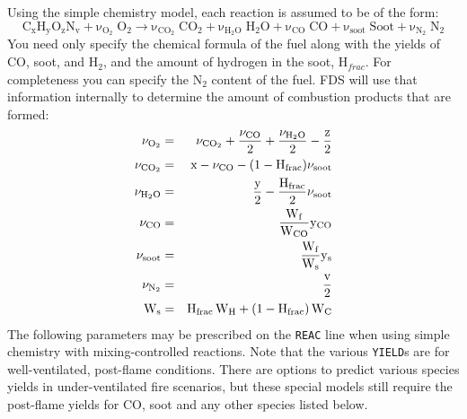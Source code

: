 \documentclass[11pt]{book}
\newcommand{\ct}{\tt\small}
\newcommand{\be}{\begin{equation}}
\newcommand{\ee}{\end{equation}}
\begin{document}
\noindent
Using the simple chemistry model, each reaction is assumed to be of the form:
\be \mathrm{C_xH_yO_zN_v + \nu_{O_2} \; O_2 \rightarrow
    \nu_{CO_2} \; CO_2 + \nu_{H_2O} \; H_2O +
    \nu_{CO}   \; CO   + \nu_{soot} \; Soot + \nu_{N_2} \; N_2} \ee
You need only specify the chemical formula of the fuel along with
the yields of CO, soot, and H$_2$, and the amount of hydrogen in the soot, H$_{frac}$.
For completeness you can specify the N$_2$ content of
the fuel. FDS will use that information internally to
determine the amount of combustion products that are formed:
\begin{eqnarray*}
\mathrm{ \nu_{O_2}  }    &=& \mathrm{ \nu_{CO_2} + \frac{\nu_{CO}}{2} + \frac{\nu_{H_2O}}{2} - \frac{\hbox{z}}{2}  } \\
\mathrm{ \nu_{CO_2} }    &=& \mathrm{ \hbox{x} - \nu_{CO} - (1-H_{frac}) \nu_{soot} }  \\
\mathrm{ \nu_{H_2O} }    &=& \mathrm{ \frac{\hbox{y}}{2} - \frac{H_{frac}}{2} \nu_{soot}}\\
\mathrm{ \nu_{CO}   }    &=& \mathrm{ \frac{W_f}{W_{CO}} y_{CO} } \\
\mathrm{ \nu_{soot} }    &=& \mathrm{ \frac{W_f}{W_s} y_s } \\
\mathrm{ \nu_{N_2}  }    &=& \mathrm{ \frac{\hbox{v}}{2} } \\
\mathrm{ W_s        }    &=& \mathrm{ H_{frac} \, W_H + (1-H_{frac}) \, W_C }
\end{eqnarray*}
The following parameters may be prescribed on the {\ct REAC} line when using simple chemistry with mixing-controlled reactions.
Note that the various {\ct YIELD}s are for well-ventilated, post-flame conditions. There are options to
predict various species yields in under-ventilated fire scenarios, but these special models still require
the post-flame yields for CO, soot and any other species listed below.
\end{document}
